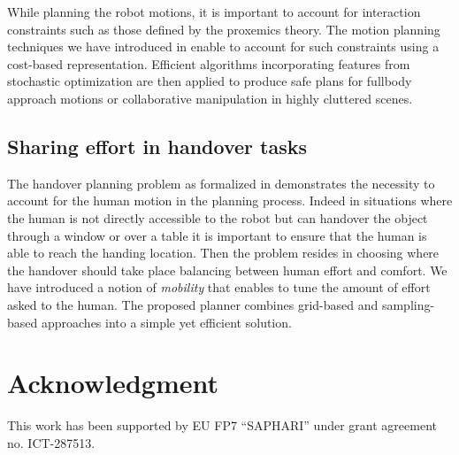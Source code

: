 \documentclass[conference]{IEEEtran}
\begin{document}
While planning the robot motions, it is important to account for interaction constraints  such as those defined by the proxemics theory. The motion planning techniques we have introduced in \cite{Mainprice:11}  enable to
account for such constraints using a cost-based representation. Efficient algorithms incorporating features from stochastic
optimization are then applied to produce safe plans for fullbody approach motions or collaborative manipulation in highly cluttered scenes.

\subsection{Sharing effort in handover tasks}

The handover planning problem as formalized in \cite{Mainprice:12} demonstrates
the necessity to account for the human motion in the planning process. Indeed in
situations where the human is not directly accessible to the robot but can handover the object through a window or over a table it is
important to ensure that the human is able to reach the handing location. Then
the problem resides in choosing where the handover should take place balancing between human effort and comfort. We have introduced a notion of \textit{mobility} that enables to tune the amount of effort asked to the human. The proposed planner combines grid-based and sampling-based approaches into a simple yet efficient solution.

\section*{Acknowledgment}

This work has been supported by EU FP7 ``SAPHARI'' under grant agreement no. ICT-287513.




\end{document}
